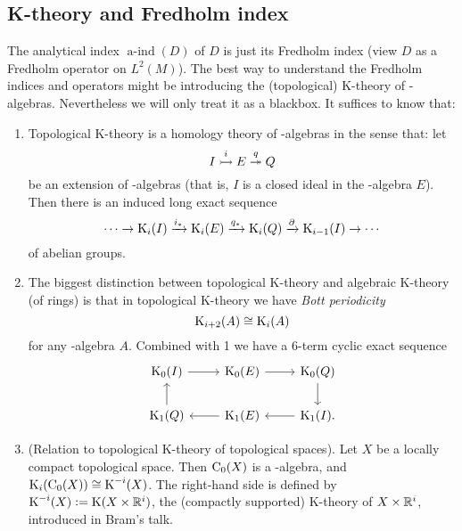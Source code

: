 \documentclass[reqno]{scrartcl}
\theoremstyle{definition}
\theoremstyle{remark}
\newcommand{\aind}{\operatorname{a-ind}}
\begin{document}
\subsection{K-theory and Fredholm index}
The analytical index $\aind(D)$ of $D$ is just its Fredholm index (view $D$ as a Fredholm operator on $L^2(M)$). The best way to understand the Fredholm indices and operators might be introducing the (topological) K-theory of \Cst-algebras. Nevertheless we will only treat it as a blackbox. It suffices to know that:
\begin{enumerate}
\item Topological K-theory is a homology theory of \Cst-algebras in the sense that: let
\[ I\overset{i}{\rightarrowtail} E\overset{q}{\twoheadrightarrow} Q \]
be an extension of \Cst-algebras (that is, $I$ is a closed ideal in the \Cst-algebra $E$). Then there is an induced long exact sequence
\[ \cdots\to\operatorname{K}_i(I)\xrightarrow{i_*}\operatorname{K}_i(E)\xrightarrow{q_*}\operatorname{K}_i(Q)\xrightarrow{\partial}\operatorname{K}_{i-1}(I)\to\cdots \]
of abelian groups.
\item The biggest distinction between topological K-theory and algebraic K-theory (of rings) is that in topological K-theory we have \emph{Bott periodicity}
\[ \operatorname{K}_{i+2}(A)\cong\operatorname{K}_i(A) \]
for any \Cst-algebra $A$. Combined with 1 we have a 6-term cyclic exact sequence
\[ \begin{tikzcd}
\K_0(I)\arrow[r] & \K_0(E)\arrow[r] & \K_0(Q)\arrow[d] \\
\K_1(Q)\arrow[u] & \K_1(E)\arrow[l] & \K_1(I)\arrow[l].
\end{tikzcd} \]
\item (Relation to topological K-theory of topological spaces). Let $X$ be a locally compact topological space. Then $\mathrm{C}_0(X)$ is a \Cst-algebra, and $\operatorname{K}_i(\mathrm{C}_0(X))\cong\operatorname{K}^{-i}(X)$. The right-hand side is defined by $\operatorname{K}^{-i}(X)\mathrel{\vcentcolon=}\operatorname{K}(X\times\mathbb{R}^i)$, the (compactly supported) K-theory of $X\times\mathbb{R}^i$, introduced in Bram's talk.
\end{enumerate}
\end{document}
